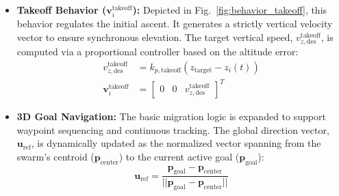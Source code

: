 \documentclass[pdflatex,sn-basic]{sn-jnl}%
\begin{document}
        \begin{itemize}
            \item \textbf{Takeoff Behavior ($\boldsymbol{v}_i^{\text{takeoff}}$):} Depicted in Fig.~\ref{fig:behavior_takeoff}, this behavior regulates the initial ascent. It generates a strictly vertical velocity vector to ensure synchronous elevation. The target vertical speed, $v_{z,\text{des}}^{\text{takeoff}}$, is computed via a proportional controller based on the altitude error:
            \begin{align}
                v_{z,\text{des}}^{\text{takeoff}} &= k_{p,\text{takeoff}}(z_{\text{target}} - z_i(t)) \\
                \boldsymbol{v}_{i}^{\text{takeoff}} &= \begin{bmatrix} 0 & 0 & v_{z,\text{des}}^{\text{takeoff}} \end{bmatrix}^T
            \end{align}

            \item \textbf{3D Goal Navigation:} The basic migration logic is expanded to support waypoint sequencing and continuous tracking. The global direction vector, $\boldsymbol{u}_{\text{ref}}$, is dynamically updated as the normalized vector spanning from the swarm's centroid ($\boldsymbol{p}_{\text{center}}$) to the current active goal ($\boldsymbol{p}_{\text{goal}}$):
            \begin{equation}
                \boldsymbol{u}_{\text{ref}}=\frac{\boldsymbol{p}_{\text{goal}}-\boldsymbol{p}_{\text{center}}}{||\boldsymbol{p}_{\text{goal}}-\boldsymbol{p}_{\text{center}}||}
            \end{equation}


\end{itemize}
\end{document}
